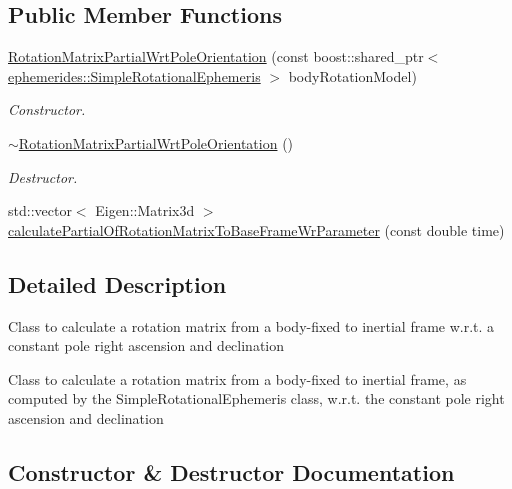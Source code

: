 \subsection*{Public Member Functions}
\begin{DoxyCompactItemize}
\item 
\hyperlink{classtudat_1_1observation__partials_1_1RotationMatrixPartialWrtPoleOrientation_a8a918033661803cc1562f1473829afa7}{Rotation\+Matrix\+Partial\+Wrt\+Pole\+Orientation} (const boost\+::shared\+\_\+ptr$<$ \hyperlink{classtudat_1_1ephemerides_1_1SimpleRotationalEphemeris}{ephemerides\+::\+Simple\+Rotational\+Ephemeris} $>$ body\+Rotation\+Model)
\begin{DoxyCompactList}\small\item\em Constructor. \end{DoxyCompactList}\item 
\hyperlink{classtudat_1_1observation__partials_1_1RotationMatrixPartialWrtPoleOrientation_a7dd9bedf18040b689fc2deb444497701}{$\sim$\+Rotation\+Matrix\+Partial\+Wrt\+Pole\+Orientation} ()\hypertarget{classtudat_1_1observation__partials_1_1RotationMatrixPartialWrtPoleOrientation_a7dd9bedf18040b689fc2deb444497701}{}\label{classtudat_1_1observation__partials_1_1RotationMatrixPartialWrtPoleOrientation_a7dd9bedf18040b689fc2deb444497701}

\begin{DoxyCompactList}\small\item\em Destructor. \end{DoxyCompactList}\item 
std\+::vector$<$ Eigen\+::\+Matrix3d $>$ \hyperlink{classtudat_1_1observation__partials_1_1RotationMatrixPartialWrtPoleOrientation_a71d9dc1d5b75f3ca59621a680d494d54}{calculate\+Partial\+Of\+Rotation\+Matrix\+To\+Base\+Frame\+Wr\+Parameter} (const double time)
\end{DoxyCompactItemize}


\subsection{Detailed Description}
Class to calculate a rotation matrix from a body-\/fixed to inertial frame w.\+r.\+t. a constant pole right ascension and declination

Class to calculate a rotation matrix from a body-\/fixed to inertial frame, as computed by the Simple\+Rotational\+Ephemeris class, w.\+r.\+t. the constant pole right ascension and declination 

\subsection{Constructor \& Destructor Documentation}
